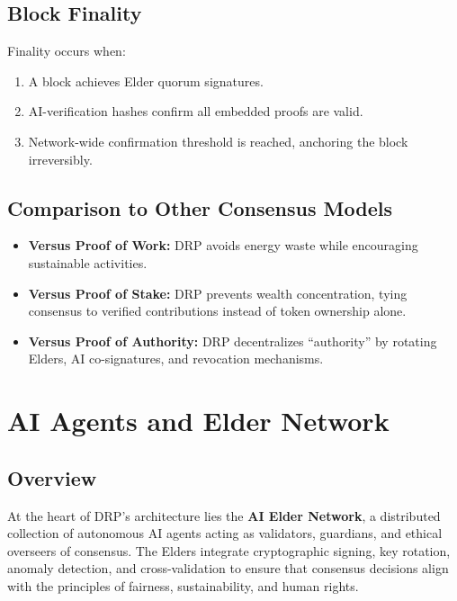 \documentclass[11pt,a4paper]{article}
\begin{document}
\subsection{Block Finality}
Finality occurs when:
\begin{enumerate}
    \item A block achieves Elder quorum signatures.
    \item AI-verification hashes confirm all embedded proofs are valid.
    \item Network-wide confirmation threshold is reached, anchoring the block irreversibly.
\end{enumerate}

\subsection{Comparison to Other Consensus Models}
\begin{itemize}
    \item \textbf{Versus Proof of Work:} DRP avoids energy waste while encouraging sustainable activities.
    \item \textbf{Versus Proof of Stake:} DRP prevents wealth concentration, tying consensus to verified contributions instead of token ownership alone.
    \item \textbf{Versus Proof of Authority:} DRP decentralizes “authority” by rotating Elders, AI co-signatures, and revocation mechanisms.
\end{itemize}

\section{AI Agents and Elder Network}

\subsection{Overview}
At the heart of DRP’s architecture lies the \textbf{AI Elder Network}, a distributed collection of autonomous AI agents acting as validators, guardians, and ethical overseers of consensus. The Elders integrate cryptographic signing, key rotation, anomaly detection, and cross-validation to ensure that consensus decisions align with the principles of fairness, sustainability, and human rights.
\end{document}
